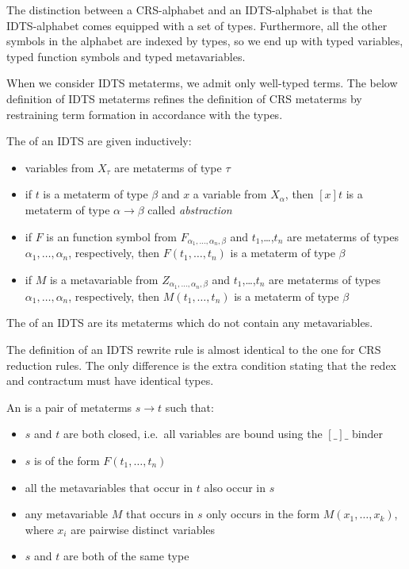 The distinction between a CRS-alphabet and an IDTS-alphabet is that the
IDTS-alphabet comes equipped with a set of types. Furthermore, all the
other symbols in the alphabet are indexed by types, so we end up with typed
variables, typed function symbols and typed metavariables.

When we consider IDTS metaterms, we admit only well-typed terms. The below
definition of IDTS metaterms refines the definition of CRS metaterms by
restraining term formation in accordance with the types.

\begin{definition}
  The  of an IDTS are given inductively:
  \begin{itemize}
  \item variables from $X_\tau$ are metaterms of type $\tau$
  \item if $t$ is a metaterm of type $\beta$ and $x$ a variable from
    $X_\alpha$, then $[x]t$ is a metaterm of type $\alpha \to \beta$ called
    \emph{abstraction}
  \item if $F$ is an function symbol from
    $F_{\alpha_1,\ldots,\alpha_n,\beta}$ and $t_1$,\ldots,$t_n$ are
    metaterms of types $\alpha_1,\ldots,\alpha_n$, respectively, then
    $F(t_1,\ldots,t_n)$ is a metaterm of type $\beta$
  \item if $M$ is a metavariable from $Z_{\alpha_1,\ldots,\alpha_n,\beta}$
    and $t_1$,\ldots,$t_n$ are metaterms of types
    $\alpha_1,\ldots,\alpha_n$, respectively, then $M(t_1,\ldots,t_n)$ is a
    metaterm of type $\beta$
  \end{itemize}
\end{definition}

\begin{definition}
  The  of an IDTS are its metaterms which do not contain any
  metavariables.
\end{definition}

The definition of an IDTS rewrite rule is almost identical to the one for
CRS reduction rules. The only difference is the extra condition stating
that the redex and contractum must have identical types.

\begin{definition}
  An  is a pair of metaterms $s \to t$ such that:
  \begin{itemize}
  \item $s$ and $t$ are both closed, i.e.\ all variables are bound using
    the $[\_]\_$ binder
  \item $s$ is of the form $F(t_1,\ldots,t_n)$
  \item all the metavariables that occur in $t$ also occur in $s$
  \item any metavariable $M$ that occurs in $s$ only occurs in the form
    $M(x_1,\ldots,x_k)$, where $x_i$ are pairwise distinct variables
  \item $s$ and $t$ are both of the same type
  \end{itemize}
\end{definition}

